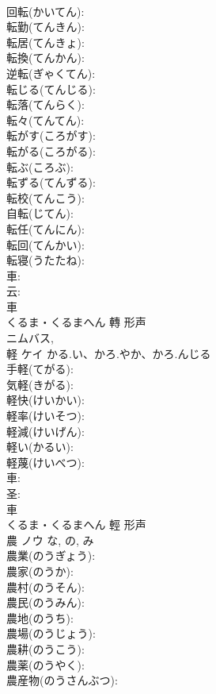 \documentclass[8pt]{extreport}
\begin{document}
\begin{CJK}{UTF8}{min}
\\	回転(かいてん): 
\\	転勤(てんきん): 
\\	転居(てんきょ): 
\\	転換(てんかん): 
\\	逆転(ぎゃくてん): 
\\	転じる(てんじる): 
\\	転落(てんらく): 
\\	転々(てんてん): 
\\	転がす(ころがす): 
\\	転がる(ころがる): 
\\	転ぶ(ころぶ): 
\\	転ずる(てんずる): 
\\	転校(てんこう): 
\\	自転(じてん): 
\\	転任(てんにん): 
\\	転回(てんかい): 
\\	転寝(うたたね): 
\\	車: 
\\	云: 
\\	車	
\\	くるま・くるまへん	轉	形声 
\\	{ニム}バス, 
\\	軽	ケイ	かる.い、かろ.やか、かろ.んじる		
\\	手軽(てがる): 
\\	気軽(きがる): 
\\	軽快(けいかい): 
\\	軽率(けいそつ): 
\\	軽減(けいげん): 
\\	軽い(かるい): 
\\	軽蔑(けいべつ): 
\\	車: 
\\	圣: 
\\	車	
\\	くるま・くるまへん	輕	形声 
\\	農	ノウ		な, の, み	
\\	農業(のうぎょう): 
\\	農家(のうか): 
\\	農村(のうそん): 
\\	農民(のうみん): 
\\	農地(のうち): 
\\	農場(のうじょう): 
\\	農耕(のうこう): 
\\	農薬(のうやく): 
\\	農産物(のうさんぶつ): 

\end{CJK}
\end{document}
